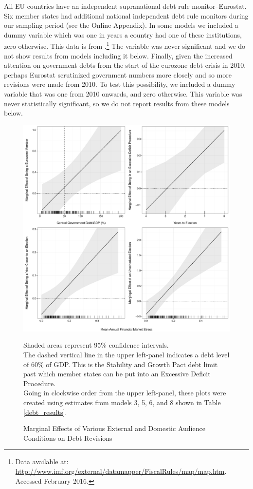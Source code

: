 \documentclass[]{article}
\begin{document}
All EU countries have an independent supranational debt rule monitor--Eurostat. Six member states had additional national independent debt rule monitors during our sampling period (see the Online Appendix). In some models we included a dummy variable which was one in years a country had one of these institutions, zero otherwise. This data is from \cite{bova2015rules}.\footnote{Data available at: \url{http://www.imf.org/external/datamapper/FiscalRules/map/map.htm}. Accessed February 2016.} The variable was never significant and we do not show results from models including it below. Finally, given the increased attention on government debts from the start of the eurozone debt crisis in 2010, perhaps Eurostat scrutinized government numbers more closely and so more revisions were made from 2010. To test this possibility, we included a dummy variable that was one from 2010 onwards, and zero otherwise. This variable was never statistically significant, so we do not report results from these models below.

\begin{figure}
    \caption{Marginal Effects of Various External and Domestic Audience Conditions on Debt Revisions}
    \label{me_comb}

    \begin{center}
        \includegraphics[scale=0.55]{figures/debt_me_comb.pdf}
    \end{center}

	{\scriptsize{Shaded areas represent 95\% confidence intervals.\\
    The dashed vertical line in the upper left-panel indicates a debt level of 60\% of GDP. This is the Stability and Growth Pact debt limit past which member states can be put into an Excessive Deficit Procedure. \\
    Going in clockwise order from the upper left-panel, these plots were created using estimates from models 3, 5, 6, and 8 shown in Table \ref{debt_results}.
    }}

\end{figure}
\end{document}
